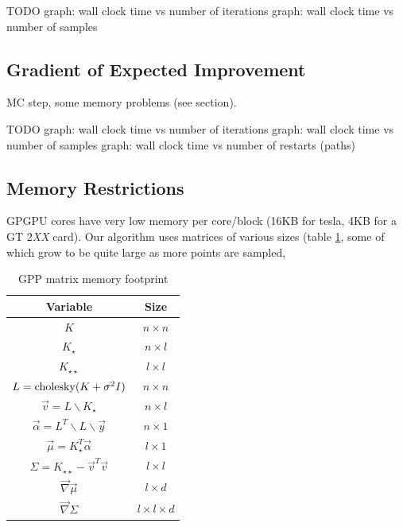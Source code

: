 \documentclass[phd,tocprelim]{cornell}
\begin{document}
TODO
graph: wall clock time vs number of iterations
graph: wall clock time vs number of samples

\subsection{Gradient of Expected Improvement}

MC step, some memory problems (see section).

TODO
graph: wall clock time vs number of iterations
graph: wall clock time vs number of samples
graph: wall clock time vs number of restarts (paths)

\subsection{Memory Restrictions} %
\label{sub:Memory Restrictions}

GPGPU cores have very low memory per core/block (16KB for tesla, 4KB for a GT 2{\it XX} card). Our algorithm uses matrices of various sizes (table \ref{EPImemory}, some of which grow to be quite large as more points are sampled,

\begin{table}
    \caption{GPP matrix memory footprint}
    \label{EPImemory}
\begin{center}
    \begin{tabular}{c|c}
    Variable & Size \\
    \hline
    $K$ & $n \times n$ \\
    $K_{\star }$ & $n \times l$ \\
    $K_{\star \star }$ & $l \times l$ \\ 
    $L = {\rm cholesky}(K + \sigma^{2}I) $ & $n \times n$ \\
    $\vec{v} = L \backslash K_{\star }$ & $n \times l$ \\
    $\vec{\alpha} = L^{T} \backslash L \backslash \vec{y}$ & $n \times 1$ \\
    $\vec{\mu} = K_{\star }^{T}\vec{\alpha}$ & $l \times 1$  \\
    $\Sigma = K_{\star \star} - \vec{v}^{T}\vec{v}$ & $l \times l$ \\
    $\vec{\nabla} \vec{\mu}$ & $l \times d$ \\
    $\vec{\nabla} \Sigma$ & $l \times l \times d$
    \end{tabular}
\end{center}
\end{table}
\end{document}
